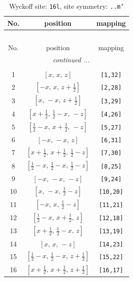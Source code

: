 \documentclass[fleqn,8pt]{jsarticle}
\begin{document}
\renewcommand{\arraystretch}{1.2}
\begin{longtable}{ccc}
\caption{Wyckoff site: {\tt 16l}, site symmetry: {\tt ..m'}}
 \\
 \hline \hline
No. & position & mapping \\ \hline \endfirsthead

\multicolumn{2}{l}{\tablename\ \thetable{}} \\
 \hline \hline
No. & position & mapping \\ \hline \endhead

 \hline \hline
\multicolumn{2}{r}{\footnotesize\it continued ...} \\ \endfoot

 \hline \hline
\multicolumn{2}{r}{} \\ \endlastfoot

1 & $\left[ x,\, x,\, z \right]$ & {\tt [1,32]} \\ \hline
2 & $\left[ - x,\, x,\, z + \frac{1}{2} \right]$ & {\tt [2,28]} \\ \hline
3 & $\left[ x,\, - x,\, z + \frac{1}{2} \right]$ & {\tt [3,29]} \\ \hline
4 & $\left[ x + \frac{1}{2},\, \frac{1}{2} - x,\, - z \right]$ & {\tt [4,26]} \\ \hline
5 & $\left[ \frac{1}{2} - x,\, x + \frac{1}{2},\, - z \right]$ & {\tt [5,27]} \\ \hline
6 & $\left[ - x,\, - x,\, z \right]$ & {\tt [6,31]} \\ \hline
7 & $\left[ x + \frac{1}{2},\, x + \frac{1}{2},\, \frac{1}{2} - z \right]$ & {\tt [7,30]} \\ \hline
8 & $\left[ \frac{1}{2} - x,\, \frac{1}{2} - x,\, \frac{1}{2} - z \right]$ & {\tt [8,25]} \\ \hline
9 & $\left[ - x,\, - x,\, - z \right]$ & {\tt [9,24]} \\ \hline
10 & $\left[ x,\, - x,\, \frac{1}{2} - z \right]$ & {\tt [10,20]} \\ \hline
11 & $\left[ - x,\, x,\, \frac{1}{2} - z \right]$ & {\tt [11,21]} \\ \hline
12 & $\left[ \frac{1}{2} - x,\, x + \frac{1}{2},\, z \right]$ & {\tt [12,18]} \\ \hline
13 & $\left[ x + \frac{1}{2},\, \frac{1}{2} - x,\, z \right]$ & {\tt [13,19]} \\ \hline
14 & $\left[ x,\, x,\, - z \right]$ & {\tt [14,23]} \\ \hline
15 & $\left[ \frac{1}{2} - x,\, \frac{1}{2} - x,\, z + \frac{1}{2} \right]$ & {\tt [15,22]} \\ \hline
16 & $\left[ x + \frac{1}{2},\, x + \frac{1}{2},\, z + \frac{1}{2} \right]$ & {\tt [16,17]} \\
\end{longtable}
\end{document}

